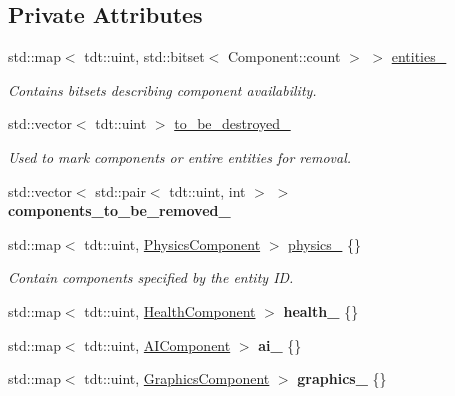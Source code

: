 \subsection*{Private Attributes}
\begin{DoxyCompactItemize}
\item 
std\+::map$<$ tdt\+::uint, std\+::bitset$<$ Component\+::count $>$ $>$ \hyperlink{class_entity_system_a830f1669703edf2e3d6271c3732f8ef5}{entities\+\_\+}
\begin{DoxyCompactList}\small\item\em Contains bitsets describing component availability. \end{DoxyCompactList}\item 
std\+::vector$<$ tdt\+::uint $>$ \hyperlink{class_entity_system_a3b18dc742fb036c9fae1836136b3e115}{to\+\_\+be\+\_\+destroyed\+\_\+}
\begin{DoxyCompactList}\small\item\em Used to mark components or entire entities for removal. \end{DoxyCompactList}\item 
std\+::vector$<$ std\+::pair$<$ tdt\+::uint, int $>$ $>$ {\bfseries components\+\_\+to\+\_\+be\+\_\+removed\+\_\+}\hypertarget{class_entity_system_abacca25b459b880924b38226206257dd}{}\label{class_entity_system_abacca25b459b880924b38226206257dd}

\item 
std\+::map$<$ tdt\+::uint, \hyperlink{struct_physics_component}{Physics\+Component} $>$ \hyperlink{class_entity_system_a6d0a97449d5346dbc389abbedccf06f8}{physics\+\_\+} \{\}
\begin{DoxyCompactList}\small\item\em Contain components specified by the entity ID. \end{DoxyCompactList}\item 
std\+::map$<$ tdt\+::uint, \hyperlink{struct_health_component}{Health\+Component} $>$ {\bfseries health\+\_\+} \{\}\hypertarget{class_entity_system_a10ce033f36068b73c6300a9ac76afc2c}{}\label{class_entity_system_a10ce033f36068b73c6300a9ac76afc2c}

\item 
std\+::map$<$ tdt\+::uint, \hyperlink{struct_a_i_component}{A\+I\+Component} $>$ {\bfseries ai\+\_\+} \{\}\hypertarget{class_entity_system_acaf09bbfa8f91493c7126c93413873ee}{}\label{class_entity_system_acaf09bbfa8f91493c7126c93413873ee}

\item 
std\+::map$<$ tdt\+::uint, \hyperlink{struct_graphics_component}{Graphics\+Component} $>$ {\bfseries graphics\+\_\+} \{\}\hypertarget{class_entity_system_a2c3bda5d6b20ac2e9534c3d3d0eb31e7}{}\label{class_entity_system_a2c3bda5d6b20ac2e9534c3d3d0eb31e7}


\end{DoxyCompactItemize}
